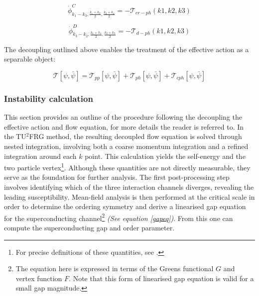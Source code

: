 \documentclass[12pt]{article}
\begin{document}
\begin{equation}\label{con2}
    \dot{\phi}^{C}_{k_1 - k_3, \frac{k_1 +k_3}{2}, \frac{k_2+k_4}{2}} = - \mathcal{T}_{cr-ph}(k1,k2,k3)
\end{equation}

\begin{equation}\label{con}
    \dot{\phi}^{D}_{k_3- k_2, \frac{k_1 + k_4}{2}, \frac{k_2+k_3}{2}} = - \mathcal{T}_{d-ph}(k1,k2,k3)
\end{equation}

\noindent The decoupling outlined above enables the treatment of the effective action as a separable object:

\begin{equation}
    \mathcal{T}[\psi, \bar{\psi}] = \mathcal{T}_{pp}[\psi, \bar{\psi}] + \mathcal{T}_{ph}[\psi, \bar{\psi}] + \mathcal{T}_{cph}[\psi, \bar{\psi}]
\end{equation}

\medskip





\subsubsection{Instability calculation}

This section provides an outline of the procedure following the decoupling the effective action and flow equation, for more details the reader is referred to\cite{profe2023functional}. 
In the TU$^2$FRG method, the resulting decoupled flow equation is solved through nested integration, involving both a coarse momentum integration and a
refined integration around each $k$ point.  This calculation yields the self-energy and the two particle vertex\footnote{For precise definitions of these quantities, see \cite{metzner2012functional}.}.
Although these quantities are not directly measurable, they serve as the foundation for further analysis. The first post-processing step involves
identifying which of the three interaction channels diverges, revealing the leading susceptibility. Mean-field analysis\cite{reiss2007renormalized} is then performed at the critical scale in order to determine the ordering symmetry 
and derive a linearised gap equation for the superconducting channel\footnote{The equation here is expressed in terms of the Greens functional $G$ and vertex function $F$. Note that this form of linearised gap equation is valid for a small gap magnitude. }
\textit{(See equation \ref{gapeq})}\cite{profe2023functional}. From this one can compute 
the superconducting gap and order parameter.
\end{document}
